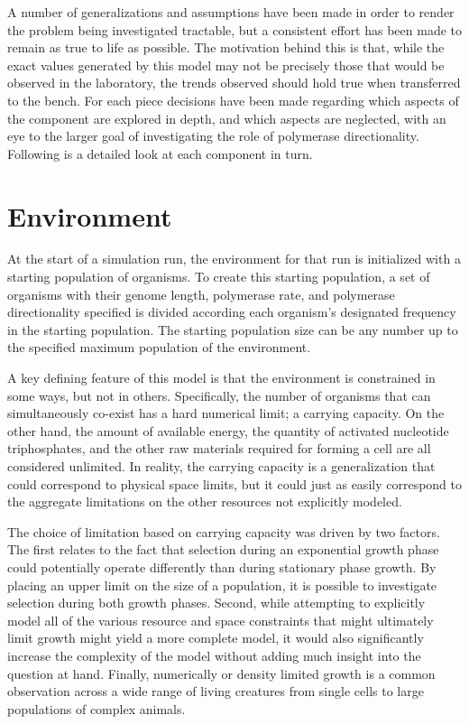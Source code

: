 A number of generalizations and assumptions have been made in order to render the problem being investigated tractable, but a consistent effort has been made to remain as true to life as possible. The motivation behind this is that, while the exact values generated by this model may not be precisely those that would be observed in the laboratory, the trends observed should hold true when transferred to the bench. For each piece decisions have been made regarding which aspects of the component are explored in depth, and which aspects are neglected, with an eye to the larger goal of investigating the role of polymerase directionality. Following is a detailed look at each component in turn.

\section*{Environment} %
\label{sec:environment}
At the start of a simulation run, the environment for that run is initialized with a starting population of organisms. To create this starting population, a set of organisms with their genome length, polymerase rate, and polymerase directionality specified is divided according each organism's designated frequency in the starting population. The starting population size can be any number up to the specified maximum population of the environment.

A key defining feature of this model is that the environment is constrained in some ways, but not in others. Specifically, the number of organisms that can simultaneously co-exist has a hard numerical limit; a carrying capacity. On the other hand, the amount of available energy, the quantity of activated nucleotide triphosphates, and the other raw materials required for forming a cell are all considered unlimited. In reality, the carrying capacity is a generalization that could correspond to physical space limits, but it could just as easily correspond to the aggregate limitations on the other resources not explicitly modeled.

The choice of limitation based on carrying capacity was driven by two factors. The first relates to the fact that selection during an exponential growth phase could potentially operate differently than during stationary phase growth. By placing an upper limit on the size of a population, it is possible to investigate selection during both growth phases. Second, while attempting to explicitly model all of the various resource and space constraints that might ultimately limit growth might yield a more complete model, it would also significantly increase the complexity of the model without adding much insight into the question at hand. Finally, numerically or density limited growth is a common observation across a wide range of living creatures from single cells to large populations of complex animals\cite{Ferenci:1999p703}.

